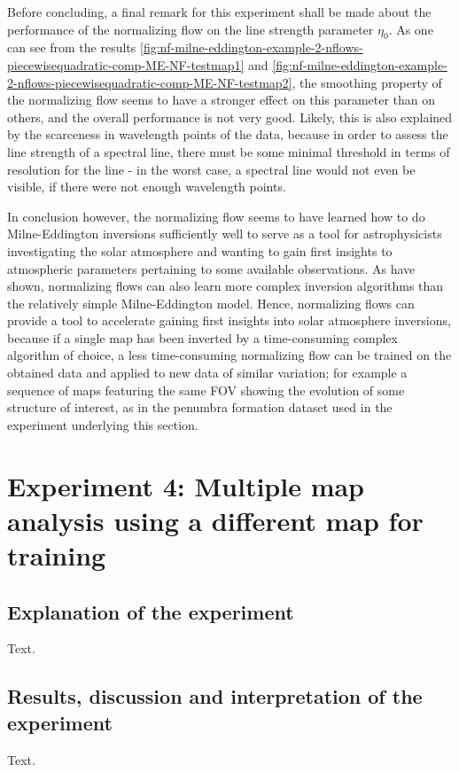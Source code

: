 \documentclass[a4paper,12pt]{report}
\begin{document}
Before concluding, a final remark for this experiment shall be made about the performance of the normalizing flow on the line strength parameter $\eta_0$. As one can see from the results \cref{fig:nf-milne-eddington-example-2-nflows-piecewisequadratic-comp-ME-NF-testmap1} and \cref{fig:nf-milne-eddington-example-2-nflows-piecewisequadratic-comp-ME-NF-testmap2}, the smoothing property of the normalizing flow seems to have a stronger effect on this parameter than on others, and the overall performance is not very good. Likely, this is also explained by the scarceness in wavelength points of the data, because in order to assess the line strength of a spectral line, there must be some minimal threshold in terms of resolution for the line - in the worst case, a spectral line would not even be visible, if there were not enough wavelength points.

In conclusion however, the normalizing flow seems to have learned how to do Milne-Eddington inversions sufficiently well to serve as a tool for astrophysicists investigating the solar atmosphere and wanting to gain first insights to atmospheric parameters pertaining to some available observations. As \cite{DiazBaso.2022} have shown, normalizing flows can also learn more complex inversion algorithms than the relatively simple Milne-Eddington model. Hence, normalizing flows can provide a tool to accelerate gaining first insights into solar atmosphere inversions, because if a single map has been inverted by a time-consuming complex algorithm of choice, a less time-consuming normalizing flow can be trained on the obtained data and applied to new data of similar variation; for example a sequence of maps featuring the same FOV showing the evolution of some structure of interest, as in the penumbra formation dataset used in the experiment underlying this section.

\FloatBarrier
\section{Experiment 4: Multiple map analysis using a different map for training}
\subsection{Explanation of the experiment}
Text.

\subsection{Results, discussion and interpretation of the experiment}
Text.
\end{document}
